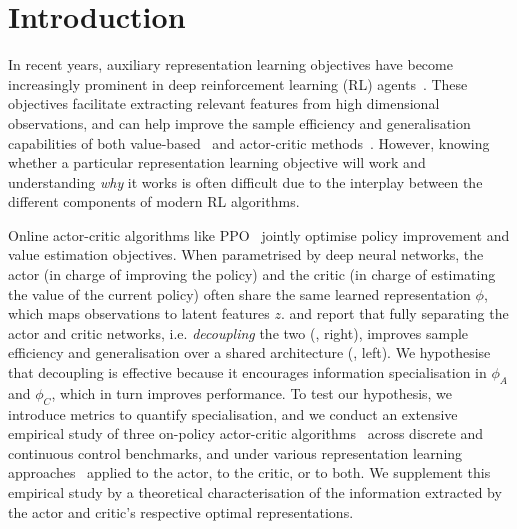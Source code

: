 \section{Introduction}
In recent years, auxiliary representation learning objectives have become increasingly prominent in deep reinforcement learning (RL) agents~\citep{yarats2021image,mhairiCMID}. These objectives facilitate extracting relevant features from high dimensional observations, and can help improve the sample efficiency and generalisation capabilities of both value-based~\citep{anand2019unsupervised,Schwarzer2021DataEfficientRL} and actor-critic methods~\citep{sac-ae,dbc,mcinroe2023hksl}. However, knowing whether a particular representation learning objective will work and understanding \textit{why} it works is often difficult due to the interplay between the different components of modern RL algorithms.

Online actor-critic algorithms like PPO~\citep{PPO} jointly optimise policy improvement and value estimation objectives. When parametrised by deep neural networks, the actor (in charge of improving the policy) and the critic (in charge of estimating the value of the current policy) often share the same learned representation $\phi$, which maps observations to latent features $z$. \citet{PPG} and \citet{raileanu2021decoupling} report that fully separating the actor and critic networks, i.e. \textit{decoupling} the two (, right), improves sample efficiency and generalisation over a shared architecture (, left). We hypothesise that decoupling is effective because it encourages information specialisation in $\phi_A$ and $\phi_C$, which in turn improves performance. To test our hypothesis, we introduce metrics to quantify specialisation, and we conduct an extensive empirical study of three on-policy actor-critic algorithms~\citep{PPO,PPG,DCPG} across discrete and continuous control benchmarks, and under various representation learning approaches~\citep{raileanu2021decoupling,DCPG,raileanu2021UCB-DrAC,MICo} applied to the actor, to the critic, or to both.  We supplement this empirical study by a theoretical characterisation of the information extracted by the actor and critic's respective optimal representations.

